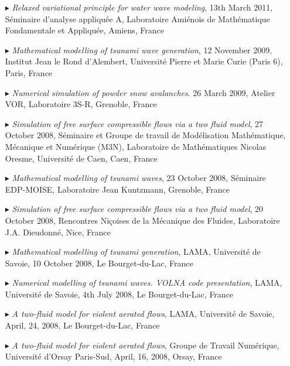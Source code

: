 \begin{itemize}
  \item[$\blacktriangleright$] \textit{Relaxed variational principle for water wave modeling}, 13th March 2011, S\'eminaire d'analyse appliqu\'ee A, Laboratoire Ami\'enois de Math\'ematique Fondamentale et Appliqu\'ee, Amiens, France
  
  \item[$\blacktriangleright$] \textit{Mathematical modelling of tsunami wave generation}, 12 November 2009, Institut Jean le Rond d'Alembert, Universit\'e Pierre et Marie Curie (Paris 6), Paris, France
  
  \item[$\blacktriangleright$] \textit{Numerical simulation of powder snow avalanches}. 26 March 2009, Atelier VOR, Laboratoire 3S-R, Grenoble, France
  
  \item[$\blacktriangleright$] \textit{Simulation of free surface compressible flows via a two fluid model}, 27 October 2008, S\'eminaire et Groupe de travail de Mod\'elisation Math\'ematique, M\'ecanique et Num\'erique (M3N), Laboratoire de Math\'ematiques Nicolas Oresme, Universit\'e de Caen, Caen, France
  
  \item[$\blacktriangleright$] \textit{Mathematical modelling of tsunami waves}, 23 October 2008, S\'eminaire EDP-MOISE, Laboratoire Jean Kuntzmann, Grenoble, France
  
  \item[$\blacktriangleright$] \textit{Simulation of free surface compressible flows via a two fluid model}, 20 October 2008, Rencontres Ni\c{c}oises de la M\'ecanique des Fluides, Laboratoire J.A. Dieudonn\'e, Nice, France
  
  \item[$\blacktriangleright$] \textit{Mathematical modelling of tsunami generation}, LAMA, Universit\'e de Savoie, 10 October 2008, Le Bourget-du-Lac, France
  
  \item[$\blacktriangleright$] \textit{Numerical modelling of tsunami waves. VOLNA code presentation}, LAMA, Universit\'e de Savoie, 4th July 2008, Le Bourget-du-Lac, France
  
  \item[$\blacktriangleright$] \textit{A two-fluid model for violent aerated flows}, LAMA, Universit\'e de Savoie, April, 24, 2008, Le Bourget-du-Lac, France
  
  \item[$\blacktriangleright$] \textit{A two-fluid model for violent aerated flows}, Groupe de Travail Num\'erique, Universit\'e d'Orsay Paris-Sud, April, 16, 2008, Orsay, France
  

\end{itemize}
